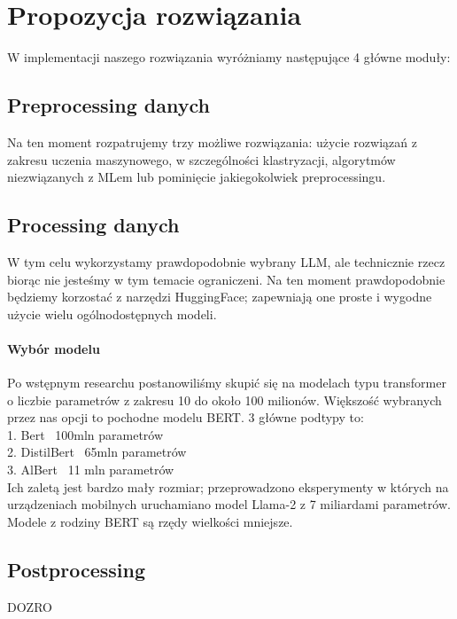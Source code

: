\documentclass[12pt]{article}
\begin{document}
\section*{Propozycja rozwiązania}
W implementacji naszego rozwiązania wyróżniamy następujące 4 główne moduły: \\
\subsection*{Preprocessing danych}
Na ten moment rozpatrujemy trzy możliwe rozwiązania: użycie rozwiązań z zakresu uczenia maszynowego, w szczególności klastryzacji, algorytmów niezwiązanych z MLem lub pominięcie jakiegokolwiek preprocessingu. \\
\subsection*{Processing danych}
W tym celu wykorzystamy prawdopodobnie wybrany LLM, ale technicznie rzecz biorąc nie jesteśmy w tym temacie ograniczeni. Na ten moment prawdopodobnie będziemy korzostać z narzędzi HuggingFace; zapewniają one proste i wygodne użycie wielu ogólnodostępnych modeli. \\
\paragraph{Wybór modelu}
Po wstępnym researchu postanowiliśmy skupić się na modelach typu transformer o liczbie parametrów z zakresu 10 do około 100 milionów. Większość wybranych przez nas opcji to pochodne modelu BERT\cite{devlin2019bertpretrainingdeepbidirectional}. 3 główne podtypy to: \\
1. Bert ~100mln parametrów \\
2. DistilBert ~65mln parametrów \\
3. AlBert ~11 mln parametrów \\
Ich zaletą jest bardzo mały rozmiar; przeprowadzono eksperymenty\cite{LLMmobile2024} w których na urządzeniach mobilnych uruchamiano model Llama-2 z 7 miliardami parametrów. Modele z rodziny BERT są rzędy wielkości mniejsze.
\subsection*{Postprocessing}
DOZRO \\
\end{document}
